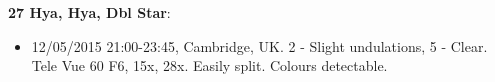 {\bf 27 Hya, Hya, Dbl Star}:
\begin{itemize}
\item 12/05/2015 21:00-23:45, Cambridge, UK. 2 - Slight undulations, 5 - Clear. Tele Vue 60 F6, 15x, 28x. Easily split. Colours detectable.
\end{itemize}
